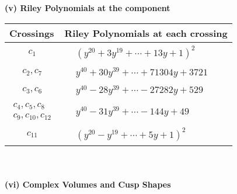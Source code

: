 \documentclass[1p]{elsarticle_modified}
\theoremstyle{definition}
\begin{document}
\newpage\renewcommand{\arraystretch}{1}
\flushleft \textbf{(v) Riley Polynomials at the component}\newline \\
\begin{tabular}{m{50pt}|m{274pt}}
Crossings & \hspace{64pt}Riley Polynomials at each crossing \\
\hline $$\begin{aligned}c_{1}\end{aligned}$$&$\begin{aligned}
&(y^{20}+3 y^{19}+\cdots+13 y+1)^{2}
\end{aligned}$\\
\hline $$\begin{aligned}c_{2},c_{7}\end{aligned}$$&$\begin{aligned}
&y^{40}+30 y^{39}+\cdots+71304 y+3721
\end{aligned}$\\
\hline $$\begin{aligned}c_{3},c_{6}\end{aligned}$$&$\begin{aligned}
&y^{40}-28 y^{39}+\cdots-27282 y+529
\end{aligned}$\\
\hline $$\begin{aligned}c_{4},c_{5},c_{8}\\c_{9},c_{10},c_{12}\end{aligned}$$&$\begin{aligned}
&y^{40}-31 y^{39}+\cdots-144 y+49
\end{aligned}$\\
\hline $$\begin{aligned}c_{11}\end{aligned}$$&$\begin{aligned}
&(y^{20}- y^{19}+\cdots+5 y+1)^{2}
\end{aligned}$\\
\hline
\end{tabular}\\~\\
\newpage\flushleft \textbf{(vi) Complex Volumes and Cusp Shapes}
\end{document}
